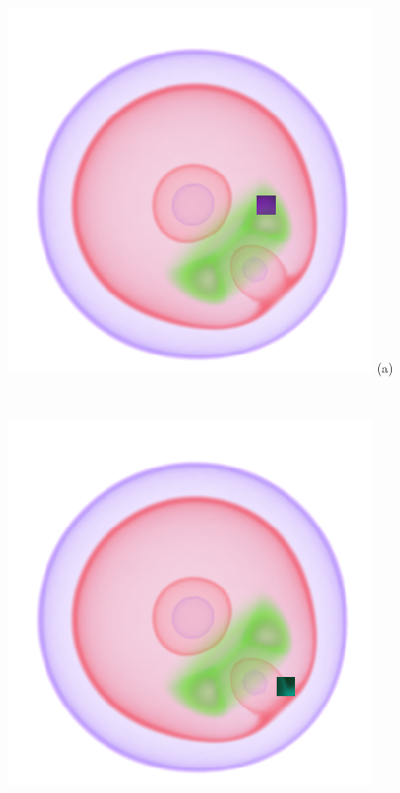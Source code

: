 \documentclass[twoside,twocolumn,10pt]{article}
\begin{document}
\begin{figure}
	\centering
	\begin{minipage}{.16\textwidth}
		\centering
		\includegraphics[width=1\linewidth]{crop/nucleon_selection_green}
(a)
	\end{minipage}~
	\begin{minipage}{.16\textwidth}
		\centering
		\includegraphics[width=1\linewidth]{crop/nucleon_selection_red}

\end{minipage}
\end{figure}
\end{document}
